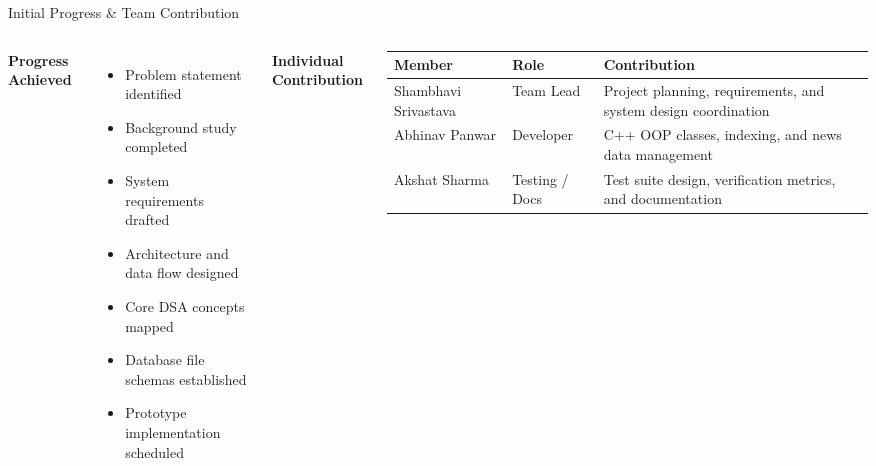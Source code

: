 \documentclass[aspectratio=169,10pt]{beamer}
\def\tightlistspacing{%
  \setlength{\itemsep}{1.2pt}%
  \setlength{\parsep}{0pt}%
  \setlength{\topsep}{1pt}%
  \setlength{\partopsep}{0pt}%
}
\begin{document}
\begin{frame}{Initial Progress \& Team Contribution}
\begin{columns}[T,totalwidth=\textwidth]
\textbf{\color{GEUBlue}\footnotesize Progress Achieved}
\begin{itemize}\scriptsize\tightlistspacing\RaggedRight
\item Problem statement identified
\item Background study completed
\item System requirements drafted
\item Architecture and data flow designed
\item Core DSA concepts mapped
\item Database file schemas established
\item Prototype implementation scheduled
\end{itemize}

\textbf{\color{GEUBlue}\footnotesize Individual Contribution}
\vspace{1mm}
\scriptsize
\renewcommand{\arraystretch}{1.15}
\begin{tabularx}{\linewidth}{@{}>{\RaggedRight\arraybackslash}p{1.75cm}>{\RaggedRight\arraybackslash}p{1.20cm}>{\RaggedRight\arraybackslash}X@{}}
\toprule
Member & Role & Contribution\\
\midrule
Shambhavi Srivastava & Team Lead & Project planning, requirements, and system design coordination\\
Abhinav Panwar & Developer & C++ OOP classes, indexing, and news data management\\
Akshat Sharma & Testing / Docs & Test suite design, verification metrics, and documentation\\
\bottomrule
\end{tabularx}
\end{columns}
\end{frame}
\end{document}
